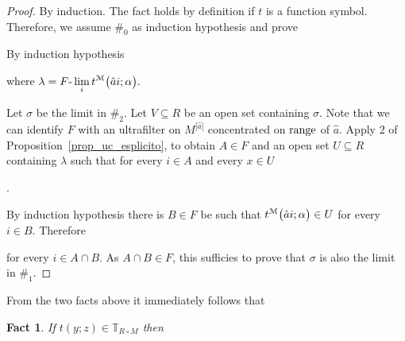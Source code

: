 \documentclass[12pt,letterpaper,oneside,reqno]{amsart}
\theoremstyle{plain}
\newtheorem{fact}[theorem]{Fact}
\theoremstyle{remark}
\begin{document}
\begin{proof}
  By induction. 
  The fact holds by definition if $t$ is a function symbol.
  Therefore, we assume $\#_0$ as induction hypothesis and prove 


  By induction hypothesis 

  \hfill where $\displaystyle\lambda=F\mbox{-}\lim_i t^{\EuScript M}\big(\hat ai;\alpha\big).$
  

  Let $\sigma$ be the limit in $\#_2$.
  Let $V\subseteq R$ be an open set containing $\sigma$.
  Note that we can identify $F$ with an ultrafilter on $M^{|\hat a|}$ concentrated on ${\rm range}$ of $\hat a$.
  Apply 2 of Proposition~\ref{prop_uc_esplicito}, to obtain $A\in F$ and an open set $U\subseteq R$ containing $\lambda$ such that for every $i\in A$ and every $x\in U$
  
  .

  By induction hypothesis there is $B\in F$ be such that
  $t^{\EuScript M}\big(\hat ai;\alpha\big)\in U$ for every $i\in B$. 
  Therefore

  
  for every $i\in A\cap B$.
  As $A\cap B\in F$, this sufficies to prove that $\sigma$ is also the limit in $\#_1$.
\end{proof}

From the two facts above it immediately follows that

\begin{fact}\label{fact_termini2}
  If $t(y;z)\in \mathds{T}_{R\circ M}$ then 
  
  \hfill\qedsymbol
\end{fact}

  
\end{document}
